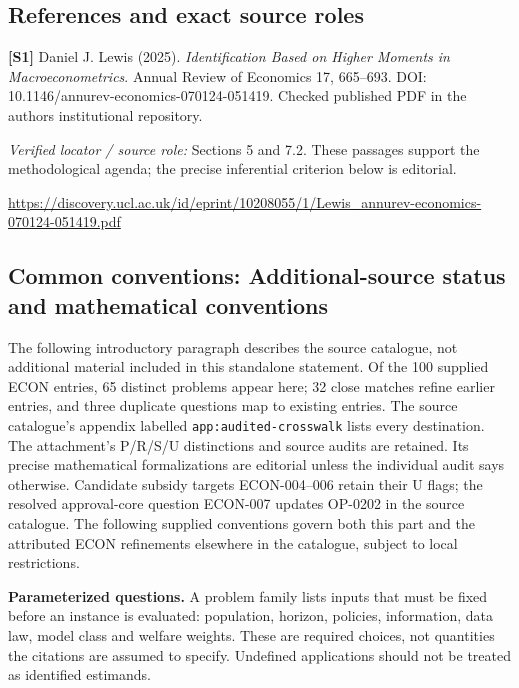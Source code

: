 \documentclass[11pt,a4paper]{article}
\begin{document}
\subsection*{References and exact source roles}

{\footnotesize\raggedright
\par\noindent\textbf{[S1]} Daniel J. Lewis (2025). \emph{Identification Based on Higher Moments in Macroeconometrics}. Annual Review of Economics 17, 665--693. DOI: 10.1146/annurev-economics-070124-051419. Checked published PDF in the author\textquotesingle s institutional repository.\par \textit{Verified locator / source role:} Sections 5 and 7.2. These passages support the methodological agenda; the precise inferential criterion below is editorial.\par \url{https://discovery.ucl.ac.uk/id/eprint/10208055/1/Lewis_annurev-economics-070124-051419.pdf}\par\smallskip
}

\subsection*{Common conventions: Additional-source status and mathematical conventions}

\label{audited:conventions}

The following introductory paragraph describes the source catalogue, not additional material included in this standalone statement.
Of the 100 supplied ECON entries, 65 distinct problems appear here; 32 close
matches refine earlier entries, and three duplicate questions map to existing
entries. The source catalogue's appendix labelled \texttt{app:audited-crosswalk} lists every destination.
The attachment's P/R/S/U distinctions and source audits are retained. Its
precise mathematical formalizations are editorial unless the individual audit
says otherwise. Candidate subsidy targets ECON-004--006 retain their U flags;
the resolved approval-core question ECON-007 updates OP-0202 in the source catalogue.
The following supplied conventions govern both this part and the attributed
ECON refinements elsewhere in the catalogue, subject to local restrictions.

\textbf{Parameterized questions.} A problem family lists inputs that must be fixed before an instance is evaluated: population, horizon, policies, information, data law, model class and welfare weights. These are required choices, not quantities the citations are assumed to specify. Undefined applications should not be treated as identified estimands.
\end{document}
